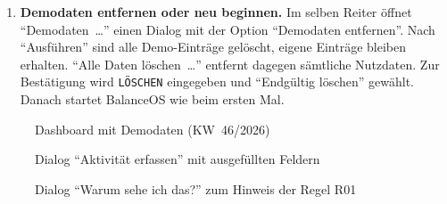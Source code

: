 \begin{enumerate}
  \item \textbf{Demodaten entfernen oder neu beginnen.} Im selben Reiter öffnet \enquote{Demodaten~…} einen Dialog mit der Option \enquote{Demodaten entfernen}. Nach \enquote{Ausführen} sind alle Demo-Einträge gelöscht, eigene Einträge bleiben erhalten. \enquote{Alle Daten löschen~…} entfernt dagegen sämtliche Nutzdaten. Zur Bestätigung wird \texttt{LÖSCHEN} eingegeben und \enquote{Endgültig löschen} gewählt. Danach startet BalanceOS wie beim ersten Mal.
\end{enumerate}

\begin{figure}[H]
  \caption{Dashboard mit Demodaten (\ac{KW}~46/2026)}\label{abb:anleitung-dashboard}
  \centering
\end{figure}

\begin{figure}[H]
  \caption{Dialog \enquote{Aktivität erfassen} mit ausgefüllten Feldern}\label{abb:anleitung-aktivitaet}
  \centering
\end{figure}

\begin{figure}[H]
  \caption{Dialog \enquote{Warum sehe ich das?} zum Hinweis der Regel R01}\label{abb:anleitung-begruendung}
  \centering
\end{figure}
